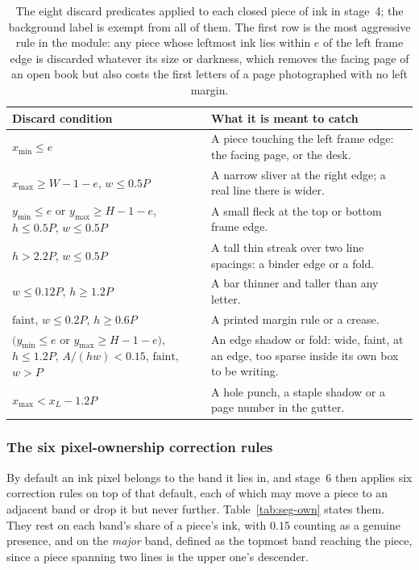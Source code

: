 \begin{table}[h]
\centering
\fontsize{8.5}{10.2}\selectfont
\setlength{\tabcolsep}{4pt}
\begin{tabularx}{\linewidth}{|p{3.3cm}|X|}
\hline
\textbf{Discard condition} & \textbf{What it is meant to catch} \\
\hline
$x_{\min}\le e$ & A piece touching the left frame edge: the facing page, or the desk. \\
\hline
$x_{\max}\ge W-1-e$, $w\le0.5P$ & A narrow sliver at the right edge; a real line there is wider. \\
\hline
$y_{\min}\le e$ or $y_{\max}\ge H-1-e$, $h\le0.5P$, $w\le0.5P$ & A small fleck at the top or bottom frame edge. \\
\hline
$h>2.2P$, $w\le0.5P$ & A tall thin streak over two line spacings: a binder edge or a fold. \\
\hline
$w\le0.12P$, $h\ge1.2P$ & A bar thinner and taller than any letter. \\
\hline
$\mathrm{faint}$, $w\le0.2P$, $h\ge0.6P$ & A printed margin rule or a crease. \\
\hline
$(y_{\min}\le e$ or $y_{\max}\ge H-1-e)$, $h\le1.2P$, $A/(hw)<0.15$, $\mathrm{faint}$, $w>P$ & An edge shadow or fold: wide, faint, at an edge, too sparse inside its own box to be writing. \\
\hline
$x_{\max}<x_L-1.2P$ & A hole punch, a staple shadow or a page number in the gutter. \\
\hline
\end{tabularx}
\caption{The eight discard predicates applied to each closed piece of ink in stage~4; the background label is exempt from all of them. The first row is the most aggressive rule in the module: any piece whose leftmost ink lies within $e$ of the left frame edge is discarded whatever its size or darkness, which removes the facing page of an open book but also costs the first letters of a page photographed with no left margin.}
\label{tab:seg-artifact}
\end{table}

\subsubsection{The six pixel-ownership correction rules}

By default an ink pixel belongs to the band it lies in, and stage~6 then applies six correction rules on top of that default, each of which may move a piece to an adjacent band or drop it but never further.
Table~\ref{tab:seg-own} states them.
They rest on each band's share of a piece's ink, with $0.15$ counting as a genuine presence, and on the \emph{major} band, defined as the topmost band reaching the piece, since a piece spanning two lines is the upper one's descender.

